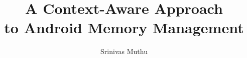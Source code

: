 \documentclass[12pt]{uthesis-v12}  %
\begin{document}

\title{A Context-Aware Approach
       \protect\\ to Android Memory Management}
       

\author{Srinivas Muthu}



\end{document}
